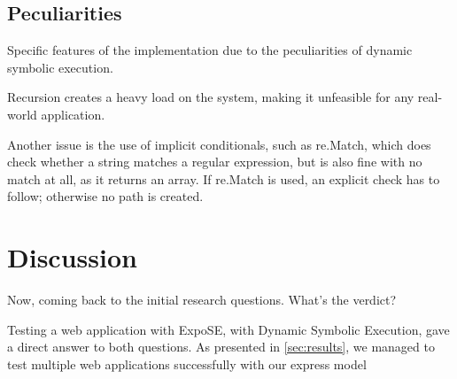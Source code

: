 \subsection{Peculiarities}
\label{sec:peculiarities}
Specific features of the implementation due to the peculiarities of dynamic symbolic execution.

Recursion creates a heavy load on the system, making it unfeasible for any real-world application. 

Another issue is the use of implicit conditionals, such as re.Match, which does check whether a string matches a regular expression, but is also fine with no match at all, as it returns an array. If re.Match is used, an explicit check has to follow; otherwise no path is created. 




\section{Discussion}
Now, coming back to the initial research questions. What's the verdict? 

Testing a web application with ExpoSE, with Dynamic Symbolic Execution, gave a direct answer to both questions. As presented in \autoref{sec:results}, we managed to test multiple web applications successfully with our express model 

